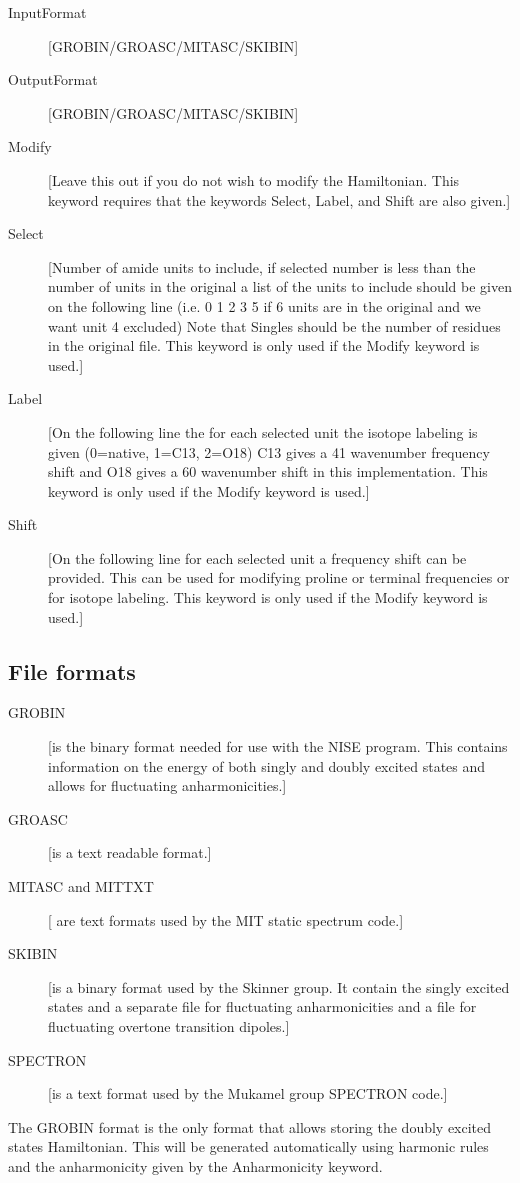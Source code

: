 \begin{description}
\item[InputFormat] [GROBIN/GROASC/MITASC/SKIBIN]
\item[OutputFormat] [GROBIN/GROASC/MITASC/SKIBIN]
\item[Modify][Leave this out if you do not wish to modify the Hamiltonian. This keyword requires that the keywords Select, Label, and Shift are also given.]
\item[Select] [Number of amide units to include, if selected number is less than the number of units in the original a list of the units to include should be given on the following line (i.e. 0 1 2 3 5 if 6 units are in the original and we want unit 4 excluded) Note that Singles should be the number of residues in the original file. This keyword is only used if the Modify keyword is used.]
\item[Label] [On the following line the for each selected unit the isotope labeling is given (0=native, 1=C13, 2=O18) C13 gives a 41 wavenumber frequency shift and O18 gives a 60 wavenumber shift in this implementation. This keyword is only used if the Modify keyword is used.]
\item[Shift] [On the following line for each selected unit a frequency shift can be provided. This can be used for modifying proline or terminal frequencies or for isotope labeling. This keyword is only used if the Modify keyword is used.]   
\end{description}

\subsection{File formats}
\begin{description}
\item[GROBIN] [is the binary format needed for use with the NISE program. This contains
information on the energy of both singly and doubly excited states and allows for
fluctuating anharmonicities.]
\item[GROASC] [is a text readable format.]
\item[MITASC and MITTXT] [ are text formats used by the MIT static spectrum code.]
\item[SKIBIN] [is a binary format used by the Skinner group. It contain the singly excited states and a
separate file for fluctuating anharmonicities and a file for fluctuating overtone transition dipoles.]
\item[SPECTRON] [is a text format used by the Mukamel group SPECTRON code.]
\end{description}
The GROBIN format is the only format that allows storing the doubly excited states Hamiltonian. This will be generated automatically using harmonic rules and the anharmonicity given by the Anharmonicity keyword.

